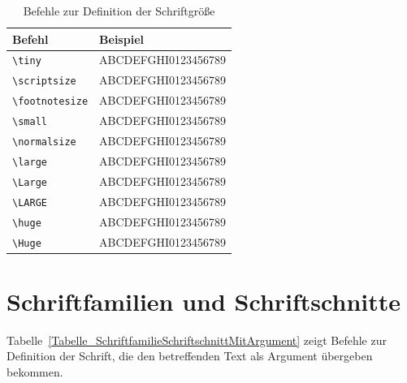 \documentclass[a4paper,10pt,twoside]{scrbook}
\begin{document}
\begin{table}[h!tb]
\centering
\caption{Befehle zur Definition der Schriftgröße}
\label{Tabelle_Schriftgroesse}       %
\begin{tabular}{ll}
\hline
Befehl & Beispiel \\
\hline
\texttt{\textbackslash tiny} & {\tiny ABCDEFGHI0123456789} \\
\texttt{\textbackslash scriptsize} & {\scriptsize ABCDEFGHI0123456789} \\
\texttt{\textbackslash footnotesize} & {\footnotesize ABCDEFGHI0123456789} \\
\texttt{\textbackslash small} & {\small ABCDEFGHI0123456789} \\
\texttt{\textbackslash normalsize} & {\normalsize ABCDEFGHI0123456789} \\
\texttt{\textbackslash large} & {\large ABCDEFGHI0123456789} \\
\texttt{\textbackslash Large} & {\Large ABCDEFGHI0123456789} \\
\texttt{\textbackslash LARGE} & {\LARGE ABCDEFGHI0123456789} \\
\texttt{\textbackslash huge} & {\huge ABCDEFGHI0123456789} \\
\texttt{\textbackslash Huge} & {\Huge ABCDEFGHI0123456789} \\
\hline
\end{tabular}
\end{table}

\section{Schriftfamilien und Schriftschnitte}
\label{AbschnittSchriftfamilienSchriftschnitte}


Tabelle~\ref{Tabelle_SchriftfamilieSchriftschnittMitArgument} zeigt Befehle zur Definition der Schrift, die den betreffenden Text als Argument übergeben bekommen.
\end{document}
